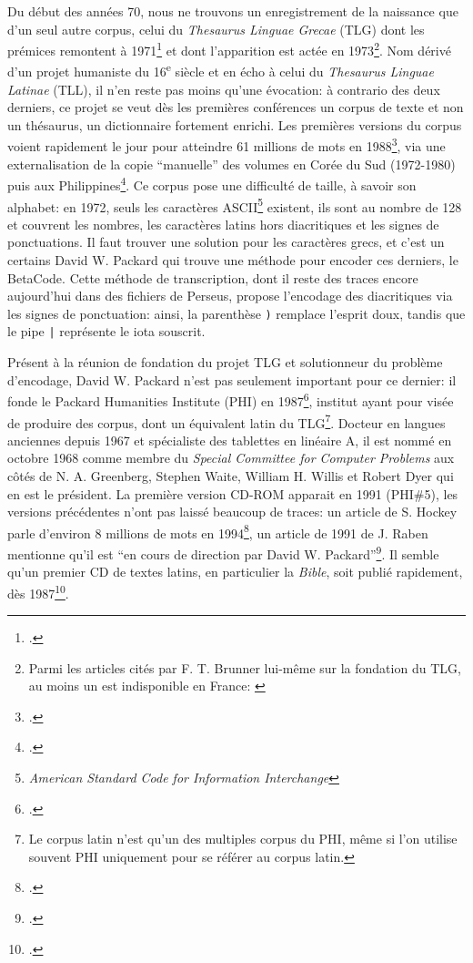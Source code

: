 Du début des années 70, nous ne trouvons un enregistrement de la naissance que d'un seul autre corpus, celui du \textit{Thesaurus Linguae Grecae} (TLG) dont les prémices remontent à 1971\footcite{brunner_classics_1993} et dont l'apparition est actée en 1973\footnote{Parmi les articles cités par F. T. Brunner lui-même sur la fondation du TLG, au moins un est indisponible en France: \cite{hugues_homer_1987}}. Nom dérivé d'un projet humaniste du 16\textsuperscript{e} siècle et en écho à celui du \textit{Thesaurus Linguae Latinae} (TLL), il n'en reste pas moins qu'une évocation: à contrario des deux derniers, ce projet se veut dès les premières conférences un corpus de texte et non un thésaurus, un dictionnaire fortement enrichi. Les premières versions du corpus voient rapidement le jour pour atteindre 61 millions de mots en 1988\footcite{brunner_overcoming_1988}, via une externalisation de la copie \enquote{manuelle} des volumes en Corée du Sud (1972-1980) puis aux Philippines\footcite[p. 111]{helgerson_cd-rom_1988}. Ce corpus pose une difficulté de taille, à savoir son alphabet: en 1972, seuls les caractères ASCII\footnote{\textit{American Standard Code for Information Interchange}} existent, ils sont au nombre de 128 et couvrent les nombres, les caractères latins hors diacritiques et les signes de ponctuations. Il faut trouver une solution pour les caractères grecs, et c'est un certains David W. Packard qui trouve une méthode pour encoder ces derniers, le BetaCode. Cette méthode de transcription, dont il reste des traces encore aujourd'hui dans des fichiers de Perseus, propose l'encodage des diacritiques via les signes de ponctuation: ainsi, la parenthèse \texttt{)} remplace l'esprit doux, tandis que le pipe \texttt{|} représente le iota souscrit.


Présent à la réunion de fondation du projet TLG et solutionneur du problème d'encodage, David W. Packard n'est pas seulement important pour ce dernier: il fonde le Packard Humanities Institute (PHI) en 1987\footcite{helgerson_cd-rom_1988}, institut ayant pour visée de produire des corpus, dont un équivalent latin du TLG\footnote{Le corpus latin n'est qu'un des multiples corpus du PHI, même si l'on utilise souvent PHI uniquement pour se référer au corpus latin.}. Docteur en langues anciennes depuis 1967 et spécialiste des tablettes en linéaire A, il est nommé en octobre 1968 comme membre du \textit{Special Committee for Computer Problems} aux côtés de N. A. Greenberg, Stephen Waite, William H. Willis et Robert Dyer qui en est le président. La première version CD-ROM apparait en 1991 (PHI\#5), les versions précédentes n'ont pas laissé beaucoup de traces: un article de S. Hockey parle d'environ 8 millions de mots en 1994\footcite{hockey_electronic_1994}, un article de 1991 de J. Raben mentionne qu'il est \enquote{en cours de direction par David W. Packard}\footcite{raben_humanities_1991}. Il semble qu'un premier CD de textes latins, en particulier la \textit{Bible}, soit publié rapidement, dès 1987\footcite{groves_tovs_1990, cornell_greek_1989}.

